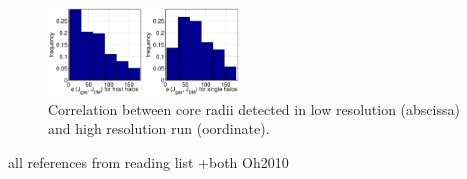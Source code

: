 \documentclass[useAMS,usenatbib]{mn2e}
\begin{document}
\begin{figure}
  \begin{center}
    \includegraphics[width=0.45\textwidth]{fig/a.eps}%
  \end{center}
  \caption{\label{fig:corr_r_core}Correlation between core radii detected in low resolution (abscissa) and high resolution run (oordinate).}
\end{figure}


%
%
%
%
%
%
%

all references from reading list +both Oh2010


%
\label{lastpage}
\end{document}
